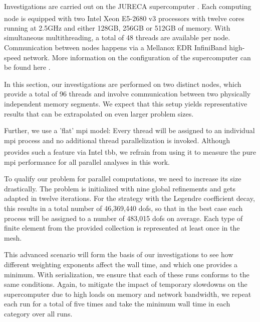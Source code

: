 
Investigations are carried out on the JURECA supercomputer \parencite{krause2016,jureca}. Each computing node is equipped with two Intel\textsuperscript{\textregistered} Xeon\textsuperscript{\textregistered} E5-2680 v3 processors with twelve cores running at 2.5GHz and either 128GB, 256GB or 512GB of memory. With simultaneous multithreading, a total of 48 threads are available per node. Communication between nodes happens via a Mellanox EDR InfiniBand high-speed network. More information on the configuration of the supercomputer can be found here \textcite{jureca}.

In this section, our investigations are performed on two distinct nodes, which provide a total of 96 threads and involve communication between two physically independent memory segments. We expect that this setup yields representative results that can be extrapolated on even larger problem sizes.

Further, we use a 'flat' \gls{mpi} model: Every thread will be assigned to an individual \gls{mpi} process and no additional thread parallelization is invoked. Although \dealii{} provides such a feature via Intel\textsuperscript{\textregistered} \gls{tbb}, we refrain from using it to measure the pure \gls{mpi} performance for all parallel analyses in this work.


To qualify our problem for parallel computations, we need to increase its size drastically. The problem is initialized with nine global refinements and gets adapted in twelve iterations. For the strategy with the Legendre coefficient decay, this results in a total number of 46,369,440 \glspl{dof}, so that in the best case each process will be assigned to a number of 483,015 \glspl{dof} on average. Each type of finite element from the provided collection is represented at least once in the mesh.

This advanced scenario will form the basis of our investigations to see how different weighting exponents affect the wall time, and which one provides a minimum. With serialization, we ensure that each of these runs conforms to the same conditions. Again, to mitigate the impact of temporary slowdowns on the supercomputer due to high loads on memory and network bandwidth, we repeat each run for a total of five times and take the minimum wall time in each category over all runs.



